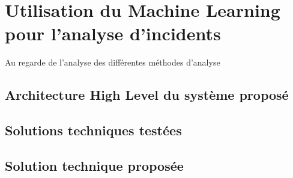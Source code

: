 \chapter{Utilisation du Machine Learning pour l'analyse d'incidents}
\label{Utilisation du Machine Learning pour l'analyse d'incidents}
\thispagestyle{fancy}

Au regarde de l'analyse des différentes méthodes d'analyse 
\section{Architecture High Level du système proposé}
\label{Utilisation du Machine Learning pour l'analyse d'incidents: Achitecture High Level du système proposé}

\section{Solutions techniques testées}
\label{Utilisation du Machine Learning pour l'analyse d'incidents: Solutions techniques testées}

\section{Solution technique proposée}
\label{Utilisation du Machine Learning pour l'analyse d'incidents: Solution technique proposée}

